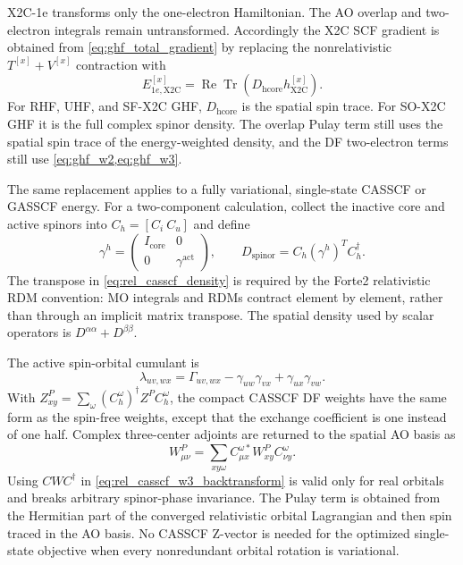 \documentclass[aip,jcp,preprint]{revtex4-1}
\newcommand{\Tr}{\operatorname{Tr}}
\newcommand{\RePart}{\operatorname{Re}}
\newcommand{\xcoord}{{[x]}}
\begin{document}
X2C-1e transforms only the one-electron Hamiltonian.  The AO overlap and
two-electron integrals remain untransformed.  Accordingly the X2C SCF gradient
is obtained from \cref{eq:ghf_total_gradient} by replacing the nonrelativistic
$T^\xcoord+V^\xcoord$ contraction with
\begin{equation}
 E_{1e,\mathrm{X2C}}^\xcoord
 =\RePart\Tr(D_\mathrm{hcore}h_\mathrm{X2C}^\xcoord).
 \label{eq:x2c_hcore_contraction}
\end{equation}
For RHF, UHF, and SF-X2C GHF, $D_\mathrm{hcore}$ is the spatial spin trace.
For SO-X2C GHF it is the full complex spinor density.  The overlap Pulay term
still uses the spatial spin trace of the energy-weighted density, and the DF
two-electron terms still use \cref{eq:ghf_w2,eq:ghf_w3}.

The same replacement applies to a fully variational, single-state CASSCF or
GASSCF energy.  For a two-component calculation, collect the inactive core
and active spinors into $C_h=[C_i\ C_u]$ and define
\begin{equation}
 \gamma^h =
 \begin{pmatrix}I_{\mathrm{core}}&0\\0&\gamma^{\mathrm{act}}\end{pmatrix},
 \qquad
 D_{\mathrm{spinor}}=C_h(\gamma^h)^T C_h^\dagger.
 \label{eq:rel_casscf_density}
\end{equation}
The transpose in \cref{eq:rel_casscf_density} is required by the Forte2
relativistic RDM convention: MO integrals and RDMs contract element by element,
rather than through an implicit matrix transpose.  The spatial density used by
scalar operators is $D^{\alpha\alpha}+D^{\beta\beta}$.

The active spin-orbital cumulant is
\begin{equation}
 \lambda_{uv,wx}
 =\Gamma_{uv,wx}-\gamma_{uw}\gamma_{vx}
  +\gamma_{ux}\gamma_{vw}.
\end{equation}
With $Z^P_{xy}=\sum_\omega
(C_h^\omega)^\dagger Z^P C_h^\omega$, the compact CASSCF DF weights have the
same form as the spin-free weights, except that the exchange coefficient is
one instead of one half.  Complex three-center adjoints are returned to the
spatial AO basis as
\begin{equation}
 W^P_{\mu\nu}=\sum_{xy\omega}
 C^{\omega *}_{\mu x}W^P_{xy}C^\omega_{\nu y}.
 \label{eq:rel_casscf_w3_backtransform}
\end{equation}
Using $C W C^\dagger$ in
\cref{eq:rel_casscf_w3_backtransform} is valid only for real orbitals and
breaks arbitrary spinor-phase invariance.  The Pulay term is obtained from the
Hermitian part of the converged relativistic orbital Lagrangian and then spin
traced in the AO basis.  No CASSCF Z-vector is needed for the optimized
single-state objective when every nonredundant orbital rotation is variational.
\end{document}
